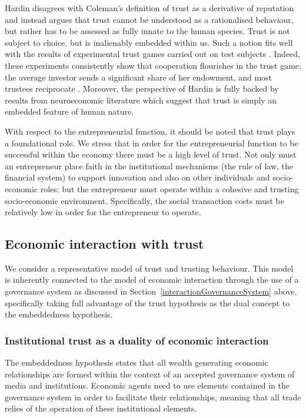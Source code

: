 \begin{subappendices}
Hardin disagrees with Coleman's definition of trust as a derivative of reputation and instead argues that trust cannot be understood as a rationalised behaviour, but rather has to be assessed as fully innate to the human species. Trust is not subject to choice, but is inalienably embedded within us. Such a notion fits well with the results of experimental trust games carried out on test subjects \citep{Kosfeld2005, Zak2008}. Indeed, these experiments consistently show that cooperation flourishes in the trust game; the average investor sends a significant share of her endowment, and most trustees reciprocate \citep{Camerer2003}. Moreover, the perspective of Hardin is fully backed by results from neuroeconomic literature which suggest that trust is simply an embedded feature of human nature.

With respect to the entrepreneurial function, it should be noted that trust plays a foundational role. We stress that in order for the entrepreneurial function to be successful within the economy there must be a high level of trust. Not only must an entrepreneur place faith in the institutional mechanisms (the rule of law, the financial system) to support innovation and also on other individuals and socio-economic roles; but the entrepreneur must operate within a cohesive and trusting socio-economic environment. Specifically, the social transaction costs must be relatively low in order for the entrepreneur to operate.

\subsection{Economic interaction with trust}

We consider a representative model of trust and trusting behaviour. This model is inherently connected to the model of economic interaction through the use of a governance system as discussed in Section~\ref{interactionGovernanceSystem} above, specifically taking full advantage of the trust hypothesis as the dual concept to the embeddedness hypothesis.

\subsubsection{Institutional trust as a duality of economic interaction}
The embeddedness hypothesis states that all wealth generating economic relationships are formed within the context of an accepted governance system of media and institutions. Economic agents need to use elements contained in the governance system in order to facilitate their relationships, meaning that all trade relies of the operation of these institutional elements.


\end{subappendices}
